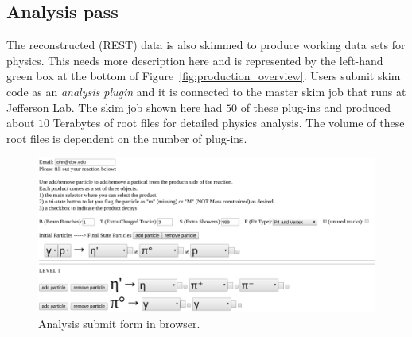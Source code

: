 \subsection{Analysis pass \label{sec:recanalysis}}

The reconstructed (REST) data is also skimmed to produce working data sets for physics. This needs more description here and is represented by the left-hand
green box at the bottom of Figure~\ref{fig:production_overview}. Users submit skim code as an \emph{analysis plugin} and it is connected to the master skim job that runs at Jefferson Lab. The skim job shown here had $50$ of these plug-ins and produced about $10$ Terabytes of root files for detailed physics analysis. The volume of these root files is dependent on the number of plug-ins.

\begin{figure}[h!]\centering
\includegraphics[width=\textwidth]{figures/analysis_submit_form.png}
\caption[]{\label{fig:production_analysis}Analysis submit form in browser.} 
\end{figure}
